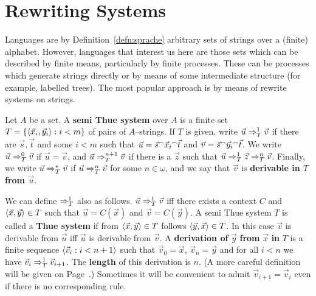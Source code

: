 \section{Rewriting Systems}
\label{kap1-5}
\label{einsdrei}
%
%
%
Languages are by Definition~\ref{defn:sprache} arbitrary sets of
strings over a (finite) alphabet. However, languages that
interest us here are those sets which can be described by finite 
means, particularly by finite processes. These can be processes 
which generate strings directly or by means of some intermediate 
structure (for example, labelled trees). The most popular approach 
is by means of rewrite systems on strings.
\begin{defn}
Let $A$ be a set. A \textbf{semi Thue system}
over $A$ is a finite set $T = \{\langle \vec{x}_i,
\vec{y}_i\rangle : i < m\}$ of pairs of $A$--strings.
If $T$ is given, write $\vec{u} \Rightarrow^1_T \vec{v}$
if there are $\vec{s}, \vec{t}$ and some $i < m$
such that $\vec{u} = \vec{s} {^{\smallfrown}} \vec{x}_i {^{\smallfrown}} \vec{t}$
and $\vec{v} = \vec{s} {^{\smallfrown}} \vec{y}_i {^{\smallfrown}} \vec{t}$.
We write $\vec{u} \Rightarrow^0_T \vec{v}$ if $\vec{u} = \vec{v}$, 
and $\vec{u} \Rightarrow^{n+1}_T \vec{v}$ if there is a
$\vec{z}$ such that $\vec{u} \Rightarrow^1_T \vec{z}
\Rightarrow^n_T \vec{v}$. Finally, we write $\vec{u}
\Rightarrow_T^{\ast} \vec{v}$ if $\vec{u} \Rightarrow^n_T \vec{v}$
for some $n \in \omega$, and we say  that $\vec{v}$
is \textbf{derivable in $T$ from $\vec{u}$}.
\end{defn}
We can define $\Rightarrow^1_T$ also as follows.
$\vec{u} \Rightarrow^1_T \vec{v}$ iff
there exists a context $C$ and $\langle \vec{x},
\vec{y}\rangle \in T$ such that $\vec{u} = C(\vec{x})$ and
$\vec{v} = C(\vec{y})$. A semi Thue system $T$ is called 
a \textbf{Thue system}
if from $\langle \vec{x}, \vec{y}\rangle \in T$ follows
$\langle \vec{y}, \vec{x}\rangle \in T$. In this case
$\vec{v}$ is derivable from $\vec{u}$ iff
$\vec{u}$ is derivable from $\vec{v}$.
A \textbf{derivation of} $\vec{y}$ \textbf{from} $\vec{x}$ 
\textbf{in} $T$ is a finite sequence $\langle \vec{v}_i : i < n+1\rangle$ 
such that $\vec{v}_0 = \vec{x}$, $\vec{v}_n = \vec{y}$ and for 
all $i < n$ we have $\vec{v}_i \Rightarrow^1_{T} \vec{v}_{i+1}$.  The 
\textbf{length} of this derivation is $n$. (A more careful 
definition will be given on Page~\pageref{derivation}.) Sometimes 
it will be convenient to admit $\vec{v}_{i+1} = \vec{v}_i$ even 
if there is no corresponding rule. 

